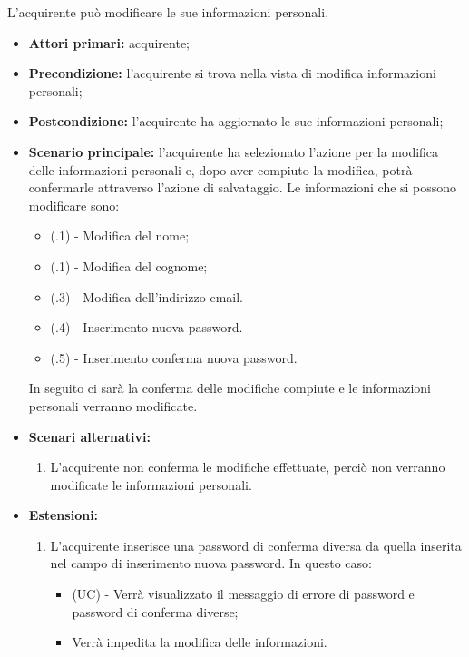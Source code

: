 
L'acquirente può modificare le sue informazioni personali.
\begin{itemize}
    \item \textbf{Attori primari:} acquirente;
    \item \textbf{Precondizione:} l'acquirente si trova nella vista di modifica informazioni personali;
    \item \textbf{Postcondizione:} l'acquirente ha aggiornato le sue informazioni personali;
    \item \textbf{Scenario principale:} l'acquirente ha selezionato l'azione per la modifica delle informazioni personali e, dopo aver compiuto la modifica, potrà confermarle attraverso l'azione di salvataggio. Le informazioni che si possono modificare sono:
    \begin{itemize}
        \item (\actualUC.1) - Modifica del nome;
        \item (\actualUC.1) - Modifica del cognome;
        \item (\actualUC.3) - Modifica dell'indirizzo email.
        \item (\actualUC.4) - Inserimento nuova password.
        \item (\actualUC.5) - Inserimento conferma nuova password.
    \end{itemize}
    In seguito ci sarà la conferma delle modifiche compiute e le informazioni personali verranno modificate.
    \item \textbf{Scenari alternativi:}
    \begin{enumerate}[label=\lett]
        \item L'acquirente non conferma le modifiche effettuate, perciò non verranno modificate le informazioni personali.
    \end{enumerate}
    \item \textbf{Estensioni:} 
    \begin{enumerate}[label=\lett] 
        \item L'acquirente inserisce una password di conferma diversa da quella inserita nel campo di inserimento nuova password. In questo caso:
        \begin{itemize}
            \item (UC) - Verrà visualizzato il messaggio di errore di password e password di conferma diverse;
            \item Verrà impedita la modifica delle informazioni.
        \end{itemize}
    \end{enumerate}
\end{itemize}

